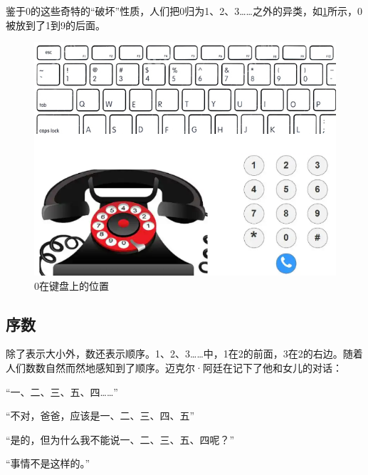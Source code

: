 \documentclass[b5paper]{ctexart}
\begin{document}
鉴于0的这些奇特的“破坏”性质，人们把0归为1、2、3……之外的异类，如\cref{fig:keyboard}所示，0被放到了1到9的后面。

\begin{figure}[htbp]
 \centering
 \includegraphics[scale=0.35]{img/keyboard}
 \caption{0在键盘上的位置}
 \label{fig:keyboard}
\end{figure}

\subsection{序数}
除了表示大小外，数还表示顺序。1、2、3……中，1在2的前面，3在2的右边。随着人们数数自然而然地感知到了顺序。迈克尔·阿廷在记下了他和女儿的对话\cite{MArtin-2011}：

“一、二、三、五、四……”

“不对，爸爸，应该是一、二、三、四、五”

“是的，但为什么我不能说一、二、三、五、四呢？”

“事情不是这样的。”

\begin{center}
\end{center}
\end{document}
